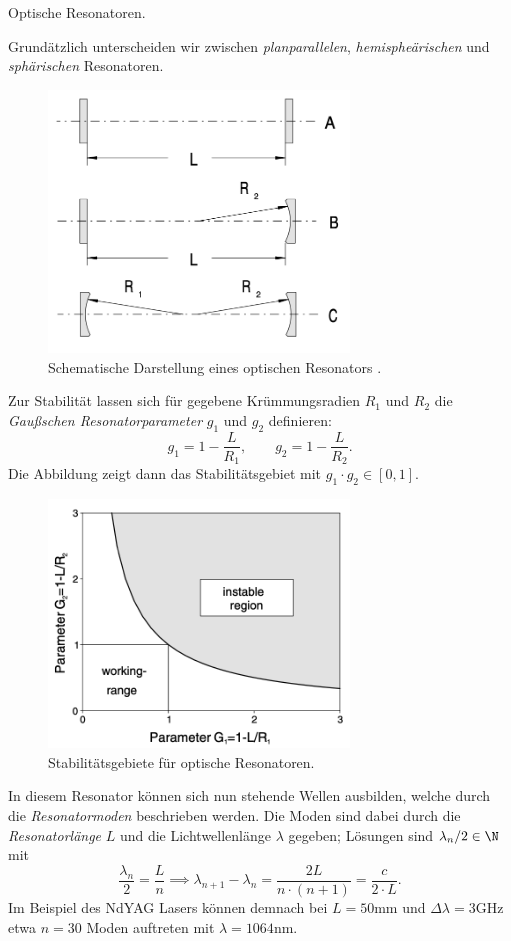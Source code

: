 \documentclass{subfiles}
\begin{document}
    \begin{Frage}
        Optische Resonatoren.
    \end{Frage}
    \begin{Antwort}
        Grundätzlich unterscheiden wir zwischen \emph{planparallelen}, \emph{hemispheärischen} und \emph{sphärischen} Resonatoren.
        \begin{figure}[H]
            \centering
            \includegraphics[width=8cm]{Bilddateien/ResonatorBasic.png}
            \caption{Schematische Darstellung eines optischen Resonators \cite{exp8-paper}.}
            \label{fig:OptischerResonator}
        \end{figure}
        Zur Stabilität lassen sich für gegebene Krümmungsradien $R_1$ und $R_2$ die \emph{Gaußschen Resonatorparameter} $g_1$ und $g_2$ definieren:
        \[
            g_1 = 1 - \frac{L}{R_1}, \qquad g_2 = 1 - \frac{L}{R_2}.
        \]
        Die Abbildung zeigt dann das Stabilitätsgebiet mit $g_1\cdot g_2\in [0,1]$.
        \begin{figure}[H]
            \centering
            \includegraphics[width=8cm]{Bilddateien/StabileGebiete.png}
            \caption{Stabilitätsgebiete für optische Resonatoren.}
            \label{fig:StabileGebiete}
        \end{figure}
        In diesem Resonator können sich nun stehende Wellen ausbilden, welche durch die \emph{Resonatormoden} beschrieben werden. Die Moden sind dabei durch die \emph{Resonatorlänge} $L$ und die Lichtwellenlänge $\lambda$ gegeben; Lösungen sind $\lambda_n/2\in\N$ mit 
        \[
            \frac{\lambda_n}{2}= \frac{L}{n}\implies \lambda_{n+1} - \lambda_n = \frac{2L}{n\cdot (n+1)} = \frac{c}{2\cdot L}.  
        \]
        Im Beispiel des NdYAG Lasers können demnach bei $L = 50\si{\mm}$ und $\Delta\lambda = 3\si{\giga\hertz}$ etwa $n = 30$ Moden auftreten mit $\lambda = 1064\si{\nano\meter}$.
    \end{Antwort}
\end{document}
